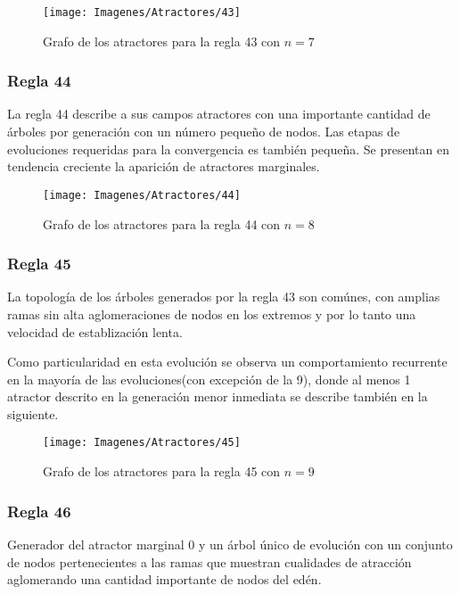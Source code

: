 \documentclass[]{article}
\begin{document}
				\hfill\break
				\hfill\break
				\begin{figure}[!h]
					\centering
					\texttt{[image: Imagenes/Atractores/43]}
					\caption{Grafo de los atractores para la regla 43 con $n=7$}
					\label{Regla_43}
				\end{figure}
				
				
			\newpage
			\subsubsection{Regla 44}
				\justifying
				La regla 44 describe a sus campos atractores con una importante cantidad de árboles por generación con un número pequeño de nodos. Las etapas de evoluciones requeridas para la convergencia es también pequeña. Se presentan en tendencia creciente la aparición de atractores marginales.
				
				\hfill\break
				\hfill\break
				\begin{figure}[!h]
					\centering
					\texttt{[image: Imagenes/Atractores/44]}
					\caption{Grafo de los atractores para la regla 44 con $n=8$}
					\label{Regla_44}
				\end{figure}
				
			\newpage
			\subsubsection{Regla 45}
				\justifying
				La topología de los árboles generados por la regla 43 son comúnes, con amplias ramas sin alta aglomeraciones de nodos en los extremos y por lo tanto una velocidad de establización lenta.
				
				\hfill\break
				\justifying
				Como particularidad en esta evolución se observa un comportamiento recurrente en la mayoría de las evoluciones(con excepción de la 9), donde al menos 1 atractor descrito en la generación menor inmediata se describe también en la siguiente.
				
				\hfill\break
				\hfill\break
				\begin{figure}[!h]
					\centering
					\texttt{[image: Imagenes/Atractores/45]}
					\caption{Grafo de los atractores para la regla 45 con $n=9$}
					\label{Regla_45}
				\end{figure}
			
			\newpage
			\subsubsection{Regla 46}
				\justifying
				Generador del atractor marginal 0 y un árbol único de evolución con un conjunto de nodos pertenecientes a las ramas que muestran cualidades de atracción aglomerando una cantidad importante de nodos del edén.
				
\end{document}

